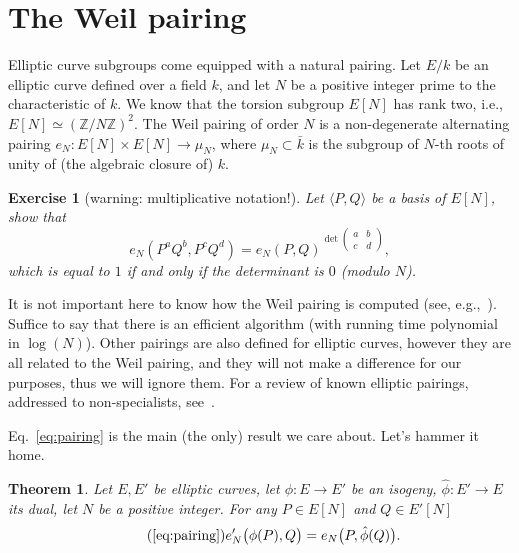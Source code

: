 \documentclass{article}
\newtheorem{ex}{Exercise}
\newtheorem{thm}[defi]{Theorem}
\def\Z{\mathbb{Z}}
\begin{document}
\section{The Weil pairing}

Elliptic curve subgroups come equipped with a natural pairing.  Let
$E/k$ be an elliptic curve defined over a field $k$, and let $N$ be a
positive integer prime to the characteristic of $k$.  We know that the
torsion subgroup $E[N]$ has rank two, i.e., $E[N]\simeq(\Z/N\Z)^2$.
The Weil pairing of order $N$ is a non-degenerate alternating pairing
$e_N:E[N]\times E[N]\to \mu_N$, where $\mu_N\subset\bar{k}$ is the
subgroup of $N$-th roots of unity of (the algebraic closure of) $k$.

\begin{ex}[warning: multiplicative notation!]
  Let $\langle P,Q\rangle$ be a basis of $E[N]$, show that
  \[e_N(P^aQ^b, P^cQ^d) =
    e_N(P,Q)^{\det\left(\begin{smallmatrix}a&b\\c&d\end{smallmatrix}\right)},\]
  which is equal to $1$ if and only if the determinant is $0$ (modulo
  $N$).
\end{ex}

It is not important here to know how the Weil pairing is computed
(see, e.g.,~\cite{galbraith2012mathematics}).  Suffice to say that
there is an efficient algorithm (with running time polynomial in
$\log(N)$).  Other pairings are also defined for elliptic curves,
however they are all related to the Weil pairing, and they will not
make a difference for our purposes, thus we will ignore them.  For a
review of known elliptic pairings, addressed to non-specialists,
see~\cite{GALBRAITH20083113}.

Eq.~\eqref{eq:pairing} is the main (the only) result we care about.
Let's hammer it home.

\begin{thm}
  Let $E,E'$ be elliptic curves, let $\phi:E\to E'$ be an isogeny,
  $\hat\phi:E'\to E$ its dual, let $N$ be a positive integer. For any
  $P\in E[N]$ and $Q\in E'[N]$
  \begin{equation}
    \tag{\ref*{eq:pairing}}
    e_N'\bigl(\phi(P), Q\bigr) = e_N\bigl(P, \hat\phi(Q)\bigr).
  \end{equation}
\end{thm}
\end{document}
